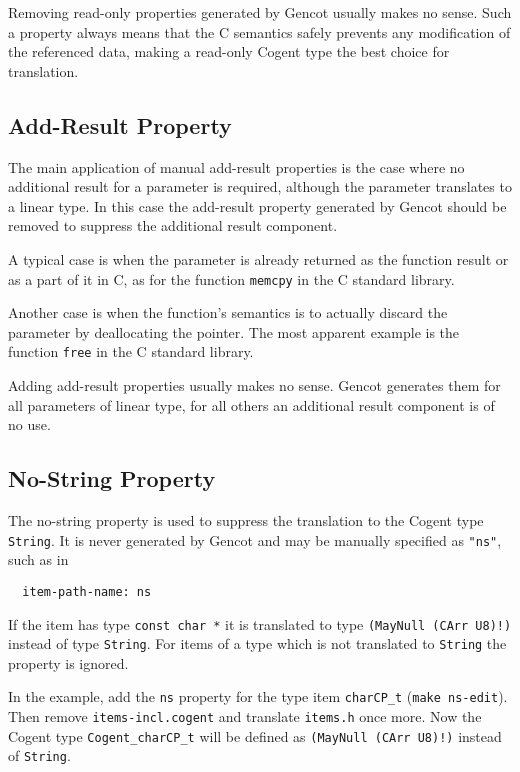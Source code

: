\documentclass[a4paper]{report}
\newcommand{\code}[1]{\textnormal{\texttt{#1}}}
\begin{document}
Removing read-only properties generated by Gencot usually makes no sense. Such a property always means that the C semantics safely
prevents any modification of the referenced data, making a read-only Cogent type the best choice for translation.

\subsection{Add-Result Property}
\label{types-manprops-ar}

The main application of manual add-result properties is the case where no additional result for a parameter is required, although
the parameter translates to a linear type. In this case the add-result property generated by Gencot should be removed 
to suppress the additional result component.

A typical case is when the parameter is already returned as the function result or as a part of it in C, as for the function
\code{memcpy} in the C standard library. 

Another case is when the function's semantics is to actually discard the parameter by deallocating the pointer. The most
apparent example is the function \code{free} in the C standard library.

Adding add-result properties usually makes no sense. Gencot generates them for all parameters of linear type, for all others
an additional result component is of no use.

\subsection{No-String Property}
\label{types-manprops-ns}

The no-string property is used to suppress the translation to the Cogent type \code{String}. It is never generated by Gencot
and may be manually specified as \code{"ns"}, such as in 
\begin{verbatim}
  item-path-name: ns
\end{verbatim}
If the item has type \code{const char *} it is translated to type \code{(MayNull (CArr U8)!)} instead of type \code{String}.
For items of a type which is not translated to \code{String} the property is ignored.

In the example, add the \code{ns} property for the type item \code{charCP\_t} (\code{make ns-edit}). Then 
remove \code{items-incl.cogent} and translate \code{items.h} once more. Now the Cogent type \code{Cogent\_charCP\_t} will
be defined as \code{(MayNull (CArr U8)!)} instead of \code{String}.
\end{document}
